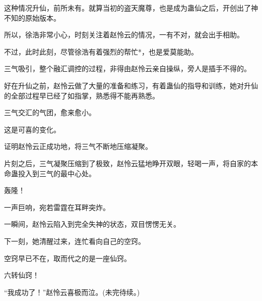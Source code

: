\begin{this_body}
这种情况升仙，前所未有。就算当初的盗天魔尊，也是成为蛊仙之后，开创出了神不知的原始版本。

所以，徐浩非常小心，时刻关注着赵怜云的情况，一有不对，就会出手相助。

不过，此时此刻，尽管徐浩有着强烈的帮忙*，也是爱莫能助。

三气吸引，整个融汇调控的过程，非得由赵怜云亲自操纵，旁人是插手不得的。

好在升仙之前，赵怜云做了大量的准备和练习，有着蛊仙的指导和训练，她对升仙的全部过程早已经了如指掌，熟悉得不能再熟悉。

三气交汇的气团，愈来愈小。

这是可喜的变化。

证明赵怜云正成功地，将三气不断地压缩凝聚。

片刻之后，三气凝聚压缩到了极致，赵怜云猛地睁开双眼，轻喝一声，将自家的本命蛊投入到三气的最中心处。

轰隆！

一声巨响，宛若雷霆在耳畔突炸。

一瞬间，赵怜云陷入到完全失神的状态，双目愣愣无关。

下一刻，她清醒过来，连忙看向自己的空窍。

空窍早已不在，取而代之的是一座仙窍。

六转仙窍！

“我成功了！”赵怜云喜极而泣。(未完待续。)

\end{this_body}

